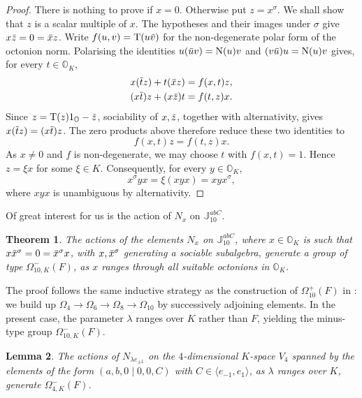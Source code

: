 \documentclass{amsart}
\def\ovt{\mathord{\mbox{\hspace*{0pt}}\:\!\overline{\!\!\;t}}\mbox{\hspace*{0pt}}}
\def\ovu{\mathord{\mbox{\hspace*{0pt}}\,\overline{\!u\!\!\;}\!\:}\mbox{\hspace*{0pt}}}
\def\ovv{\mathord{\mbox{\hspace*{0pt}}\,\overline{\!v\!\!\;}\!\:}\mbox{\hspace*{0pt}}}
\def\ovx{\mathord{\mbox{\hspace*{0pt}}\,\overline{\!x\!\!\;}\!\:}\mbox{\hspace*{0pt}}}
\def\ovz{\mathord{\mbox{\hspace*{0pt}}\,\overline{\!z\!\!\;}\!\:}\mbox{\hspace*{0pt}}}
\def\NN{\mathord{\mathrm{N}}}
\def\OO{\mathord{\mathbb{O}}}
\newcommand{\Tr}{\operatorname{T}}
\newcommand{\J}{\mathbb{J}}
\newcommand{\s}{\sigma}
\theoremstyle{plain}
\newtheorem{theorem}{Theorem}
\numberwithin{theorem}{section}
\newtheorem{lemma}[theorem]{Lemma}
\theoremstyle{definition}
\begin{document}
\begin{proof}
	There is nothing to prove if $x=0$. Otherwise put $z=x^{\s}$.
	We shall show that $z$ is a scalar multiple of $x$.
	The hypotheses and their images under $\s$ give
	$x\ovz=0=\ovx z$.
	Write $f(u,v)=\Tr(u\ovv)$ for the non-degenerate polar form of the
	octonion norm. Polarising the identities
	$u(\ovu v)=\NN(u)v$ and $(v\ovu)u=\NN(u)v$ gives, for every $t\in\OO_K$,
	\[
	\begin{aligned}
		x(\ovt z)+t(\ovx z)&=f(x,t)z,\\
		(x\ovt)z+(x\ovz)t&=f(t,z)x.
	\end{aligned}
	\]
	Since $z=\Tr(z)1_{\OO}-\ovz$, sociability of $x,\ovz$, together
	with alternativity, gives $x(\ovt z)=(x\ovt)z$.
	The zero products above therefore reduce these two identities to
	\[
		f(x,t)z=f(t,z)x.
	\]
	As $x\neq0$ and $f$ is non-degenerate, we may choose $t$ with
	$f(x,t)=1$. Hence $z=\xi x$ for some $\xi\in K$. Consequently,
	for every $y\in\OO_K$,
	\[
		x^{\s}yx=\xi(xyx)=xyx^{\s},
	\]
	where $xyx$ is unambiguous by alternativity.
\end{proof}

Of great interest for us is the action of $N_x$ on $\J_{10}^{abC}$.

\begin{theorem}
	\label{theorem:5_nx_omega}
	The actions of the elements $N_x$ on $\J_{10}^{abC}$, where $x \in \OO_K$ is such that
	\mbox{$x \ovx^{\s} = 0 = \ovx^{\s} x$}, with $x,\ovx^{\s}$ generating a sociable subalgebra,
	generate a group of type $\Omega_{10,K}^{-}(F)$, as $x$ ranges through all suitable octonions
	in $\OO_K$.
\end{theorem}

The proof follows the same inductive strategy as the construction of $\Omega_{10}^+(F)$
in \cite{BSW1}: we build up $\Omega_4 \to \Omega_6 \to \Omega_8 \to \Omega_{10}$ by
successively adjoining elements. In the present case, the parameter $\lambda$ ranges
over $K$ rather than $F$, yielding the
minus-type group $\Omega_{10,K}^{-}(F)$.

\begin{lemma}
	\label{lemma:5_omega4minus}
	The actions of $N_{\lambda e_{\pm 1}}$ on the $4$-dimensional $K$-space
	$V_4$ spanned by the elements of the form $(a,b,0\mid 0,0,C)$ with $C \in \langle e_{-1}, e_1\rangle$,
	as $\lambda$ ranges over $K$, generate $\Omega_{4,K}^{-}(F)$.
\end{lemma}
\end{document}
